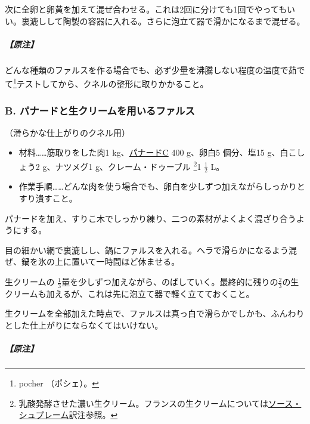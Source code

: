 \begin{recette}
次に全卵と卵黄を加えて混ぜ合わせる。これは2回に分けても1回でやってもいい。裏漉しして陶製の容器に入れる。さらに泡立て器で滑かになるまで混ぜる。

\hypertarget{nota-farce-a}{%
\subparagraph{【原注】}\label{nota-farce-a}}

どんな種類のファルスを作る場合でも、必ず少量を沸騰しない程度の温度で茹でて\footnote{pocher
  （ポシェ）。}テストしてから、クネルの整形に取りかかること。

\hypertarget{farce-b}{%
\subsubsection{B. パナードと生クリームを用いるファルス}\label{farce-b}}



（滑らかな仕上がりのクネル用）

\begin{itemize}
\item
  材料\ldots{}\ldots{}筋取りをした肉1
  kg、\protect\hyperlink{panade-c}{パナードC} 400 g、卵白5 個分、塩15
  g、白こしょう2 g、ナツメグ1 g、クレーム・ドゥーブル \footnote{乳酸発酵させた濃い生クリーム。フランスの生クリームについては\protect\hyperlink{sauce-supreme}{ソース・シュプレーム}訳注参照。}1
  \(\frac{1}{2}\) L。
\item
  作業手順\ldots{}\ldots{}どんな肉を使う場合でも、卵白を少しずつ加えながらしっかりとすり潰すこと。
\end{itemize}

パナードを加え、すりこ木でしっかり練り、二つの素材がよくよく混ざり合うようにする。

目の細かい網で裏漉しし、鍋にファルスを入れる。ヘラで滑らかになるよう混ぜ、鍋を氷の上に置いて一時間ほど休ませる。

生クリームの
\(\frac{1}{3}\)量を少しずつ加えながら、のばしていく。最終的に残りの\(\frac{2}{3}\)の生クリームも加えるが、これは先に泡立て器で軽く立てておくこと。

生クリームを全部加えた時点で、ファルスは真っ白で滑らかでしかも、ふんわりとした仕上がりにならなくてはいけない。

\hypertarget{nota-farce-b}{%
\subparagraph{【原注】}\label{nota-farce-b}}


\end{recette}
